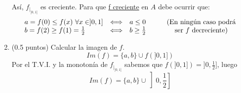 \documentclass[12pt]{article}
\begin{document}
\begin{ejercicio}[2.5 puntos]
\begin{enumerate}
            Así, $f_{|_{]0,1]}}$ es creciente. Para que \underline{f creciente} en $A$ debe ocurrir que:
            \[
            \left.
            \begin{array}{l c l c c c}
                a=f(0) \leq f(x) \text{ } \forall x \in ]0,1] & \Longleftrightarrow & a \leq 0 &&& \text{(En ningún caso podrá} \\
                b=f(2) \geq f(1)=\frac{1}{2} &  \Longleftrightarrow & b \geq \frac{1}{2} &&& \text{ser $f$ decreciente)}
            \end{array}
            \right.
            \]
            \item (0.5 puntos) Calcular la imagen de $f$. 
            \[
            Im(f) = \{a,b\} \cup f(]0,1])
            \]
            Por el T.V.I. y la monotonía de $f_{|_{]0,1]}}$ sabemos que $f(]0,1])=]0,\frac{1}{2}]$, luego
            \[
                Im(f) = \{a,b\} \cup \left]0,\frac{1}{2}\right]
            \]
        \end{enumerate}
    \end{ejercicio}



     
\end{document}
